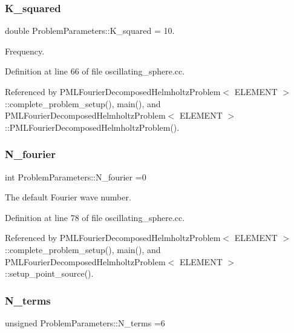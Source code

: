 \subsubsection{\texorpdfstring{K\+\_\+squared}{K\_squared}}
{\footnotesize\ttfamily double Problem\+Parameters\+::\+K\+\_\+squared = 10.}



Frequency. 



Definition at line 66 of file oscillating\+\_\+sphere.\+cc.



Referenced by P\+M\+L\+Fourier\+Decomposed\+Helmholtz\+Problem$<$ E\+L\+E\+M\+E\+N\+T $>$\+::complete\+\_\+problem\+\_\+setup(), main(), and P\+M\+L\+Fourier\+Decomposed\+Helmholtz\+Problem$<$ E\+L\+E\+M\+E\+N\+T $>$\+::\+P\+M\+L\+Fourier\+Decomposed\+Helmholtz\+Problem().

\mbox{\label{namespaceProblemParameters_aaa674958a1ca6ee0b99de3377288c93f}} 
\subsubsection{\texorpdfstring{N\+\_\+fourier}{N\_fourier}}
{\footnotesize\ttfamily int Problem\+Parameters\+::\+N\+\_\+fourier =0}



The default Fourier wave number. 



Definition at line 78 of file oscillating\+\_\+sphere.\+cc.



Referenced by P\+M\+L\+Fourier\+Decomposed\+Helmholtz\+Problem$<$ E\+L\+E\+M\+E\+N\+T $>$\+::complete\+\_\+problem\+\_\+setup(), main(), and P\+M\+L\+Fourier\+Decomposed\+Helmholtz\+Problem$<$ E\+L\+E\+M\+E\+N\+T $>$\+::setup\+\_\+point\+\_\+source().

\mbox{\label{namespaceProblemParameters_a6361f0f1c4a120e62d28db64baa84b40}} 
\subsubsection{\texorpdfstring{N\+\_\+terms}{N\_terms}}
{\footnotesize\ttfamily unsigned Problem\+Parameters\+::\+N\+\_\+terms =6}



